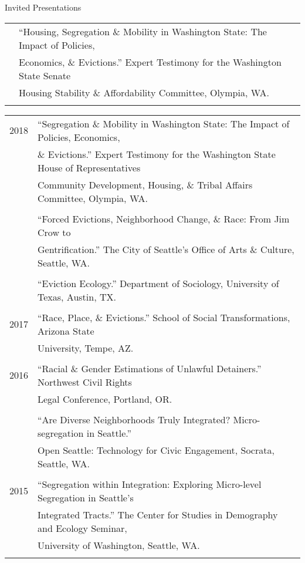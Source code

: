 \documentclass{resume} %
\begin{document}
\begin{rSection}{Invited Presentations}
\begin{tabular}{ @{} >{}l @{\hspace{6ex}} l }
	 	&``Housing, Segregation \& Mobility in Washington State: The Impact of Policies,\\
		& Economics, \& Evictions.'' Expert Testimony for the Washington State Senate\\
		& Housing Stability \& Affordability Committee, Olympia, WA.\\\\
\end{tabular}

\begin{tabular}{ @{} >{}l @{\hspace{6ex}} l }
2018 	& ``Segregation \& Mobility in Washington State: The Impact of Policies, Economics,\\
		& \& Evictions.'' Expert Testimony for the Washington State House of Representatives\\
		& Community Development, Housing, \& Tribal Affairs Committee, Olympia, WA.\\\\

	 	& ``Forced Evictions, Neighborhood Change, \& Race: From Jim Crow to\\
		& Gentrification.'' The City of Seattle's Office of Arts \& Culture, Seattle, WA.\\\\

	 	& ``Eviction Ecology.'' Department of Sociology, University of Texas, Austin, TX.\\\\

2017 	& ``Race, Place, \& Evictions.'' School of Social Transformations, Arizona State \\
		& University, Tempe, AZ.\\\\

2016 	& ``Racial \& Gender Estimations of Unlawful Detainers.'' Northwest Civil Rights\\
		& Legal Conference, Portland, OR.\\\\

	 	& ``Are Diverse Neighborhoods Truly Integrated? Micro-segregation in Seattle.''\\
		& Open Seattle: Technology for Civic Engagement, Socrata, Seattle, WA.\\\\

2015	& ``Segregation within Integration: Exploring Micro-level Segregation in Seattle’s\\
		& Integrated Tracts.'' The Center for Studies in Demography and Ecology Seminar,\\
		& University of Washington, Seattle, WA.\\\\


\end{tabular}
\end{rSection}
\end{document}
